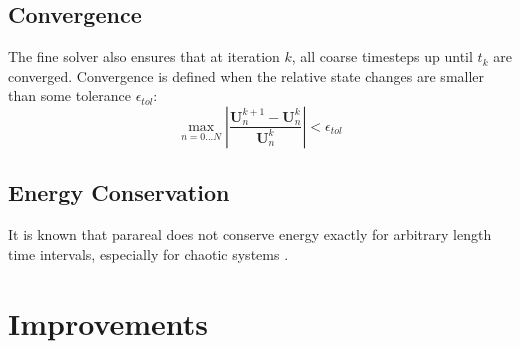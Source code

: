\subsection{Convergence}

The fine solver also ensures that at iteration $k$, all coarse timesteps up until $t_k$ are converged. Convergence is defined when the relative state changes are smaller than some tolerance $\epsilon_{tol}$:\[\max_{n=0...N}\left|\frac{\textbf{U}^{k+1}_n -\textbf{U}^{k}_n}{\textbf{U}^{k}_n} \right| < \epsilon_{tol}\]

\subsection{Energy Conservation}
It is known that parareal does not conserve energy exactly for arbitrary length time intervals, especially for chaotic systems \cite{}.
\section{Improvements}
